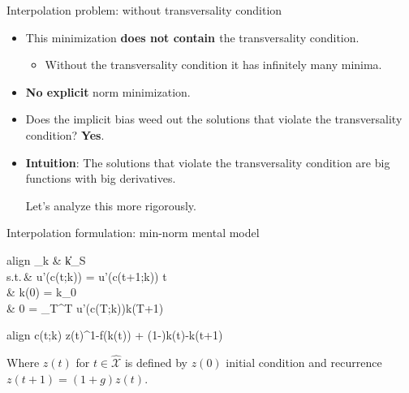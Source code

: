 \documentclass[aspectratio=169,10pt]{beamer}
\newcommand{\emphcolor}[1]{\textbf{\textcolor{emphcolorval}{#1}}}
\newcommand{\Xtrain}{\hat{\mathcal{X}}}
\newcommand{\st}{\textrm{s.t.}\,}
\begin{document}
\begin{frame}{Interpolation problem: without transversality condition}
	\begin{itemize}
		\item This minimization \emphcolor{does not contain } the transversality condition.			\smallskip
		\begin{itemize}
			\item Without the transversality condition it has infinitely many minima.
		\end{itemize}
		\bigskip
		\item \emphcolor{No explicit} norm minimization.
		\bigskip	
		\item Does the implicit bias  weed out the solutions that violate the transversality condition? \emphcolor{Yes}. 
		\bigskip 
		\item \emphcolor{Intuition}: The solutions that violate the transversality condition are big functions with big derivatives.
		\bigskip
		
		Let's analyze this more rigorously.
	\end{itemize}
\end{frame}

\begin{frame}{Interpolation formulation: min-norm mental model}
	\begin{empheq}[box=\tcbhighmath]{align}
		\min_{k \in {}} \quad & \|k\|_S\\
		\st \quad & u'(c(t;k)) = \beta u'(c(t+1;k))  \quad {} t \in \Xtrain\label{eq:seqgrowtheuler} \\
		\quad & k(0) = k_0 \label{eq:rbc-initial-condition}\\
		\quad & 0 = \lim_{T\to\infty}\beta^T u'(c(T;k))k(T+1) \label{eq:rbc-transversality}
	\end{empheq}
	\begin{empheq}[box=\tcbhighmath]{align}
		c(t;k) \equiv z(t)^{1-\alpha}f\big(k(t)\big) + (1-\delta)k(t)-k(t+1) \label{eq:seqgrowthlom}
	\end{empheq}
	Where $z(t)$ for $t  \in \Xtrain$ is defined by $z(0)$ initial condition and recurrence $z(t+1) = (1+g) z(t)$.
\end{frame}
\end{document}
